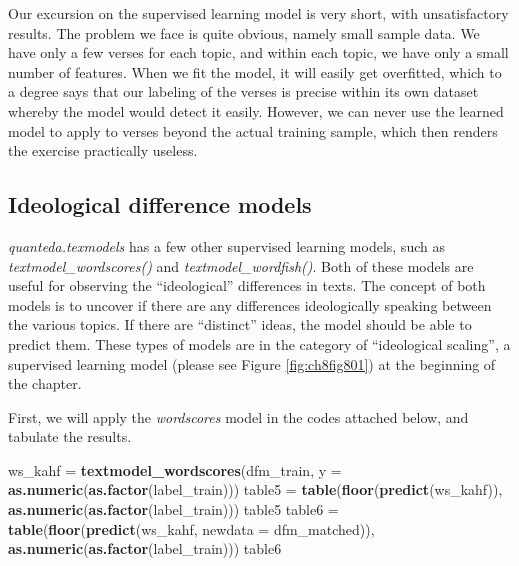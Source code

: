 \documentclass[
]{article}
\newenvironment{Shaded}{\begin{snugshade}}{\end{snugshade}}
\newcommand{\AttributeTok}[1]{\textcolor[rgb]{0.13,0.29,0.53}{#1}}
\newcommand{\FunctionTok}[1]{\textcolor[rgb]{0.13,0.29,0.53}{\textbf{#1}}}
\newcommand{\NormalTok}[1]{#1}
\newcommand{\OtherTok}[1]{\textcolor[rgb]{0.56,0.35,0.01}{#1}}
\begin{document}
Our excursion on the supervised learning model is very short, with unsatisfactory results. The problem we face is quite obvious, namely small sample data. We have only a few verses for each topic, and within each topic, we have only a small number of features. When we fit the model, it will easily get overfitted, which to a degree says that our labeling of the verses is precise within its own dataset whereby the model would detect it easily. However, we can never use the learned model to apply to verses beyond the actual training sample, which then renders the exercise practically useless.

\hypertarget{ideological-difference-models}{%
\subsection{Ideological difference models}\label{ideological-difference-models}}

\emph{quanteda.texmodels} has a few other supervised learning models, such as \emph{textmodel\_wordscores()} and \emph{textmodel\_wordfish()}. Both of these models are useful for observing the ``ideological'' differences in texts. The concept of both models is to uncover if there are any differences ideologically speaking between the various topics. If there are ``distinct'' ideas, the model should be able to predict them. These types of models are in the category of ``ideological scaling'', a supervised learning model (please see Figure \ref{fig:ch8fig801}) at the beginning of the chapter.

First, we will apply the \emph{wordscores} model in the codes attached below, and tabulate the results.

\footnotesize

\begin{Shaded}
\begin{Highlighting}[]
\NormalTok{ws\_kahf }\OtherTok{=} \FunctionTok{textmodel\_wordscores}\NormalTok{(dfm\_train,}
                               \AttributeTok{y =} \FunctionTok{as.numeric}\NormalTok{(}\FunctionTok{as.factor}\NormalTok{(label\_train)))}
\NormalTok{table5 }\OtherTok{=} \FunctionTok{table}\NormalTok{(}\FunctionTok{floor}\NormalTok{(}\FunctionTok{predict}\NormalTok{(ws\_kahf)),}
               \FunctionTok{as.numeric}\NormalTok{(}\FunctionTok{as.factor}\NormalTok{(label\_train)))}
\NormalTok{table5}
\NormalTok{table6 }\OtherTok{=} \FunctionTok{table}\NormalTok{(}\FunctionTok{floor}\NormalTok{(}\FunctionTok{predict}\NormalTok{(ws\_kahf, }\AttributeTok{newdata =}\NormalTok{ dfm\_matched)), }
               \FunctionTok{as.numeric}\NormalTok{(}\FunctionTok{as.factor}\NormalTok{(label\_train)))}
\NormalTok{table6}
\end{Highlighting}
\end{Shaded}
\end{document}
